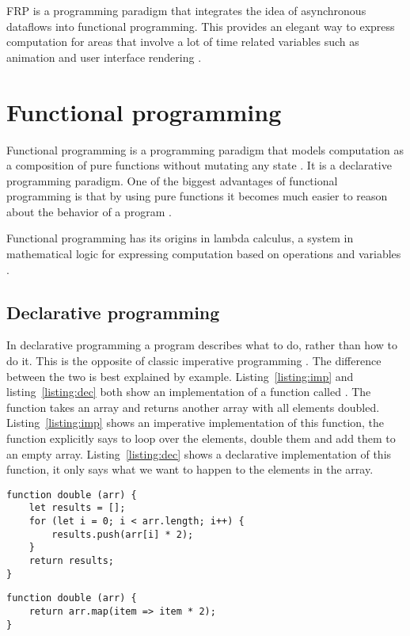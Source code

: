 FRP is a programming paradigm that integrates the idea of asynchronous dataflows into functional programming. This provides an elegant way to express computation for areas that involve a lot of time related variables such as animation and user interface rendering \cite{frp-wiki}\cite{frp-haskell}. 

\section{Functional programming} %
\label{sub:fp}

Functional programming is a programming paradigm that models computation as a composition of pure functions without mutating any state \cite{func-js}. It is a declarative programming paradigm. One of the biggest advantages of functional programming is that by using pure functions it becomes much easier to reason about the behavior of a program \cite{func-js}.

Functional programming has its origins in lambda calculus, a system in mathematical logic for expressing computation based on operations and variables \cite{lambda}.

\subsection{Declarative programming}

In declarative programming a program describes what to do, rather than how to do it. This is the opposite of classic imperative programming \cite{intro-func}. The difference between the two is best explained by example. Listing~\ref{listing:imp} and listing~\ref{listing:dec} both show an implementation of a function called . The function takes an array and returns another array with all elements doubled. Listing~\ref{listing:imp} shows an imperative implementation of this function, the function explicitly says to loop over the elements, double them and add them to an empty array. Listing~\ref{listing:dec} shows a declarative implementation of this function, it only says what we want to happen to the elements in the array.

\begin{lstlisting}[caption=Imperative implementation of the double function,label=listing:imp]
function double (arr) {
	let results = [];
	for (let i = 0; i < arr.length; i++) {
		results.push(arr[i] * 2);
	}
	return results;
}
\end{lstlisting}

\begin{lstlisting}[caption=Declarative implementation of the double function,label=listing:dec]
function double (arr) {
	return arr.map(item => item * 2);
}
\end{lstlisting}



